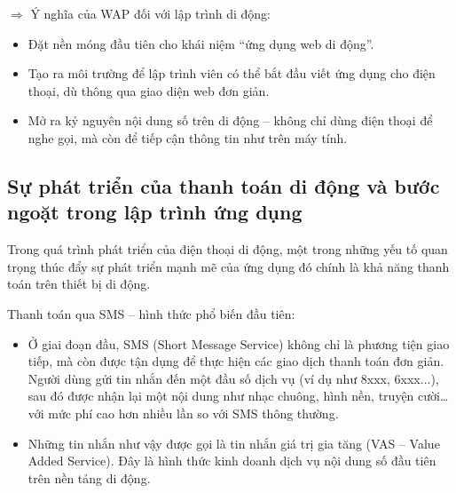   \begin{flushleft}
    \hspace*{0.8cm}$\Rightarrow$ Ý nghĩa của WAP đối với lập trình di động:
    \setlength{\leftmargini}{1.5cm}
    \begin{itemize}
        \item Đặt nền móng đầu tiên cho khái niệm “ứng dụng web di động”.
        \item Tạo ra môi trường để lập trình viên có thể bắt đầu viết ứng dụng cho điện thoại, dù thông qua giao diện web đơn giản.
        \item Mở ra kỷ nguyên nội dung số trên di động – không chỉ dùng điện thoại để nghe gọi, mà còn để tiếp cận thông tin như trên máy tính.
    \end{itemize}
  \end{flushleft}

\subsection{Sự phát triển của thanh toán di động và bước ngoặt trong lập trình ứng dụng}
\renewcommand{\labelitemi}{--}    
    \begin{flushleft}
        \hspace*{0.8cm}Trong quá trình phát triển của điện thoại di động, một trong những yếu tố quan trọng thúc đẩy sự phát triển mạnh mẽ của ứng dụng đó chính là khả năng thanh toán trên thiết bị di động.
    \end{flushleft}

    \begin{flushleft}
      \hspace*{0.8cm}Thanh toán qua SMS – hình thức phổ biến đầu tiên:
      \setlength{\leftmargini}{1.5cm}
      \begin{itemize}
          \item Ở giai đoạn đầu, SMS (Short Message Service) không chỉ là phương tiện giao tiếp, mà còn được tận dụng để thực hiện các giao dịch thanh toán đơn giản. Người dùng gửi tin nhắn đến một đầu số dịch vụ (ví dụ như 8xxx, 6xxx...), sau đó được nhận lại một nội dung như nhạc chuông, hình nền, truyện cười… với mức phí cao hơn nhiều lần so với SMS thông thường.
          \item Những tin nhắn như vậy được gọi là tin nhắn giá trị gia tăng (VAS – Value Added Service). Đây là hình thức kinh doanh dịch vụ nội dung số đầu tiên trên nền tảng di động.
      \end{itemize}
  \end{flushleft}

